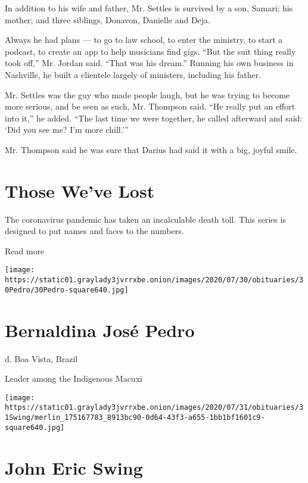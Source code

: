 In addition to his wife and father, Mr. Settles is survived by a son,
Samari; his mother; and three siblings, Donavon, Danielle and Deja.

Always he had plans --- to go to law school, to enter the ministry, to
start a podcast, to create an app to help musicians find gigs. ``But the
suit thing really took off,'' Mr. Jordan said. ``That was his dream.''
Running his own business in Nashville, he built a clientele largely of
ministers, including his father.

Mr. Settles was the guy who made people laugh, but he was trying to
become more serious, and be seen as such, Mr. Thompson said. ``He really
put an effort into it,'' he added. ``The last time we were together, he
called afterward and said: `Did you see me? I'm more chill.'''

Mr. Thompson said he was sure that Darius had said it with a big, joyful
smile.

\href{https://www.nytimes3xbfgragh.onion/interactive/2020/obituaries/people-died-coronavirus-obituaries.html?action=click\&pgtype=Article\&state=default\&region=BELOW_MAIN_CONTENT\&context=covid_obits_promo}{}

\hypertarget{those-weve-lost}{%
\section{Those We've Lost}\label{those-weve-lost}}

The coronavirus pandemic has taken an incalculable death toll. This
series is designed to put names and faces to the numbers.

Read more

\texttt{[image: https://static01.graylady3jvrrxbe.onion/images/2020/07/30/obituaries/30Pedro/30Pedro-square640.jpg]}

\hypertarget{bernaldina-josuxe9-pedro}{%
\section{Bernaldina José Pedro}\label{bernaldina-josuxe9-pedro}}

d. Boa Vista, Brazil

Leader among the Indigenous Macuxi

\texttt{[image: https://static01.graylady3jvrrxbe.onion/images/2020/07/31/obituaries/31Swing/merlin\_175167783\_8913bc90-0d64-43f3-a655-1bb1bf1601c9-square640.jpg]}

\hypertarget{john-eric-swing}{%
\section{John Eric Swing}\label{john-eric-swing}}


